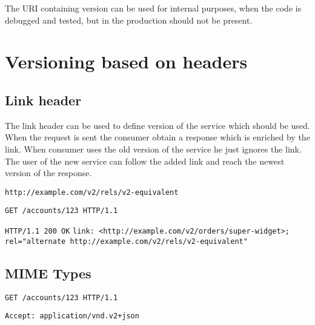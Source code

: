 The URI containing version can be used for internal purposes, when the code is debugged and tested, but in the production should not be present.

\section{Versioning based on headers}
\subsection{Link header}
The link header can be used to define version of the service which should be used. When the request is sent the consumer obtain a response which is enriched by the link. When consumer uses the old version of the service he just ignores the link. The user of the new service can follow the added link and reach the newest version of the response.

\texttt{http://example.com/v2/rels/v2-equivalent}

\texttt{GET /accounts/123 HTTP/1.1}

\texttt{HTTP/1.1 200 OK}
\texttt{link: <http://example.com/v2/orders/super-widget>; rel="alternate http://example.com/v2/rels/v2-equivalent"}


\subsection{MIME Types}

\texttt{GET /accounts/123 HTTP/1.1}

\texttt{Accept: application/vnd.v2+json}


